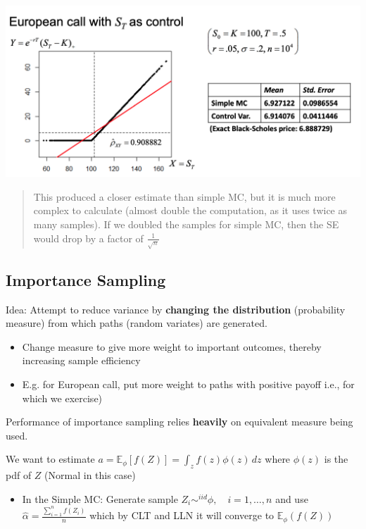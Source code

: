 \documentclass[
  oneside]{book}
\providecommand{\tightlist}{%
  \setlength{\itemsep}{0pt}\setlength{\parskip}{0pt}}
\begin{document}
\includegraphics{Notes/Obsidian-Attachments/12-Simulation-Variance-Reduction-3.png}

\begin{quote}
This produced a closer estimate than simple MC, but it is much more complex to calculate (almost double the computation, as it uses twice as many samples).
If we doubled the samples for simple MC, then the SE would drop by a factor of \(\frac{1}{\sqrt{ n }}\)
\end{quote}

\hypertarget{importance-sampling}{%
\subsection{Importance Sampling}\label{importance-sampling}}

Idea: Attempt to reduce variance by \textbf{changing the distribution} (probability measure) from which paths (random variates) are generated.

\begin{itemize}
\tightlist
\item
  Change measure to give more weight to important outcomes, thereby increasing sample efficiency
\item
  E.g. for European call, put more weight to paths with positive payoff i.e., for which we exercise)
\end{itemize}

Performance of importance sampling relies \textbf{heavily} on equivalent measure being used.

We want to estimate \(a=\mathbb{E}_{\phi}[f(Z)]=\int _{z} f(z)\phi(z) \, dz\) where \(\phi(z)\) is the pdf of \(Z\) (Normal in this case)

\begin{itemize}
\tightlist
\item
  In the Simple MC: Generate sample \(Z_{i} \sim^{iid} \phi, \quad i=1,\dots,n\) and use \(\hat{\alpha}=\frac{\sum^{n}_{i=1}f(Z_{i})}{n}\) which by CLT and LLN it will converge to \(\mathbb{E}_{\phi}(f(Z))\)
\end{itemize}
\end{document}
